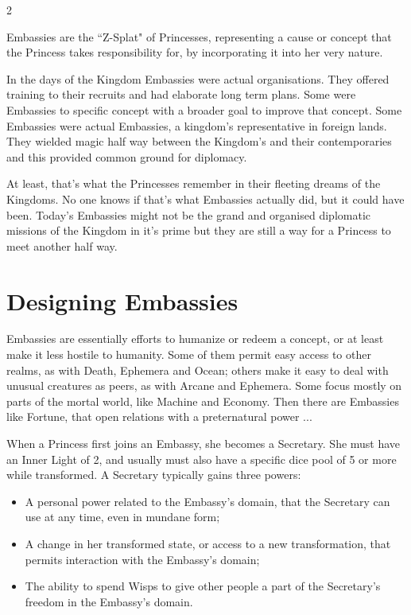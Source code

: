 
\label{cha:Embassy}


\begin{multicols}{2}\raggedcolumns

Embassies are the \textquotedblleft Z-Splat" of Princesses, representing a cause or concept that the Princess takes responsibility for, by incorporating it into her very nature. 

In the days of the Kingdom Embassies were actual organisations. They offered training to their recruits and had elaborate long term plans. Some were Embassies to specific concept with a broader goal to improve that concept. Some Embassies were actual Embassies, a kingdom's representative in foreign lands. They wielded magic half way between the Kingdom's and their contemporaries and this provided common ground for diplomacy. 

At least, that's what the Princesses remember in their fleeting dreams of the Kingdoms. No one knows if that's what Embassies actually did, but it could have been. Today's Embassies might not be the grand and organised diplomatic missions of the Kingdom in it's prime but they are still a way for a Princess to meet another half way. 

\section*{Designing Embassies}

Embassies are essentially efforts to humanize or redeem a concept, or at least make it less hostile to humanity.  Some of them permit easy access to other realms, as with Death, Ephemera and Ocean; others make it easy to deal with unusual creatures as peers, as with Arcane and Ephemera. Some focus mostly on parts of the mortal world, like Machine and Economy. Then there are Embassies like Fortune, that open relations with a preternatural power ...

When a Princess first joins an Embassy, she becomes a Secretary. She must have an Inner Light of 2, and usually must also have a specific dice pool of 5 or more while transformed. A Secretary typically gains three powers:

    \begin{itemize}
\item A personal power related to the Embassy's domain, that the Secretary can use at any time, even in mundane form;
\item     A change in her transformed state, or access to a new transformation, that permits interaction with the Embassy's domain;
    \item The ability to spend Wisps to give other people a part of the Secretary's freedom in the Embassy's domain.     \end{itemize}



\end{multicols}
